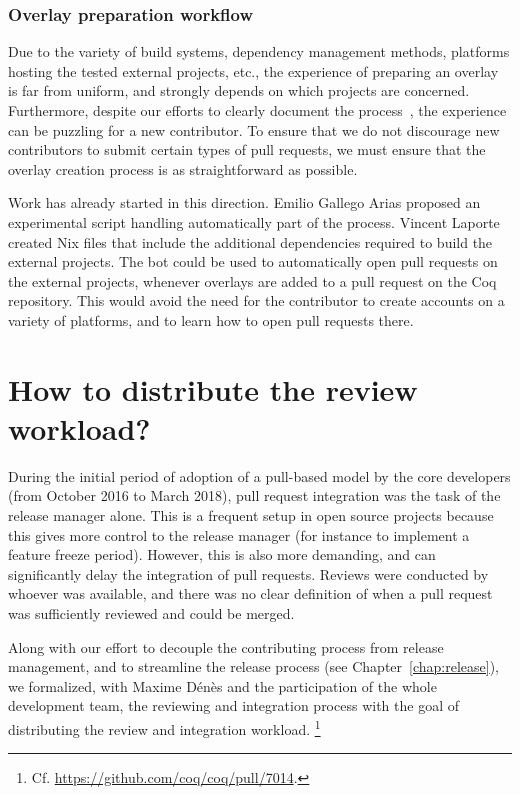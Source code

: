 \subsubsection{Overlay preparation workflow}

Due to the variety of build systems, dependency management methods, platforms hosting the tested external projects, etc., the experience of preparing an overlay is far from uniform, and strongly depends on which projects are concerned.
Furthermore, despite our efforts to clearly document the process~\cite{coq_contributing_guide,coq_ci_dev_info,coq_ci_overlay_prep}, the experience can be puzzling for a new contributor.
To ensure that we do not discourage new contributors to submit certain types of pull requests, we must ensure that the overlay creation process is as straightforward as possible.

Work has already started in this direction.
Emilio Gallego Arias proposed an experimental script handling automatically part of the process.
Vincent Laporte created Nix files that include the additional dependencies required to build the external projects.
The bot could be used to automatically open pull requests on the external projects, whenever overlays are added to a pull request on the Coq repository.
This would avoid the need for the contributor to create accounts on a variety of platforms, and to learn how to open pull requests there.

\section{How to distribute the review workload?}

\label{sec:distributed-merging}

During the initial period of adoption of a pull-based model by the core developers (from October 2016 to March 2018), pull request integration was the task of the release manager alone.
This is a frequent setup in open source projects because this gives more control to the release manager (for instance to implement a feature freeze period).
However, this is also more demanding, and can significantly delay the integration of pull requests.
Reviews were conducted by whoever was available, and there was no clear definition of when a pull request was sufficiently reviewed and could be merged.

Along with our effort to decouple the contributing process from release management, and to streamline the release process (see Chapter~\ref{chap:release}), we formalized, with Maxime D\'en\`es and the participation of the whole development team, the reviewing and integration process with the goal of distributing the review and integration workload.%
\footnote{Cf. \url{https://github.com/coq/coq/pull/7014}.}

